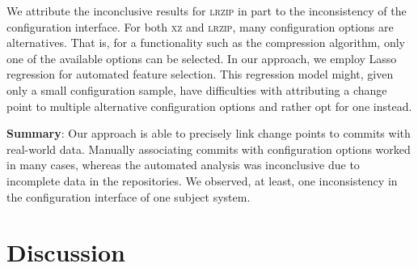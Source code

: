 \documentclass[sigconf]{acmart}
\newcommand{\greybox}[1]{
	\begin{mdframed}[backgroundcolor=black!10!white,linewidth=0pt,backgroundcolor=black!10,linewidth=0pt,innerleftmargin=5pt,innertopmargin=5pt]
		#1
	\end{mdframed}
}
\begin{document}
	We attribute the inconclusive results for \textsc{lrzip} in part to the inconsistency of the configuration interface. For both \textsc{xz} and \textsc{lrzip}, many configuration options are alternatives. That is, for a functionality such as the compression algorithm, only one of the available options can be selected. In our approach, we employ Lasso regression for automated feature selection. This regression model might, given only a small configuration sample, have difficulties with attributing a change point to multiple alternative configuration options and rather opt for one instead.  %
	\vspace{2mm}
	\greybox{
		\textbf{Summary}: Our approach is able to precisely link change points to commits with real-world data. Manually associating commits with configuration options worked in many cases, whereas the automated analysis was inconclusive due to incomplete data in the repositories. We observed, at least, one inconsistency in the configuration interface of one subject system.
	}
	
	\section{Discussion}\label{sec:discussion}
\end{document}
